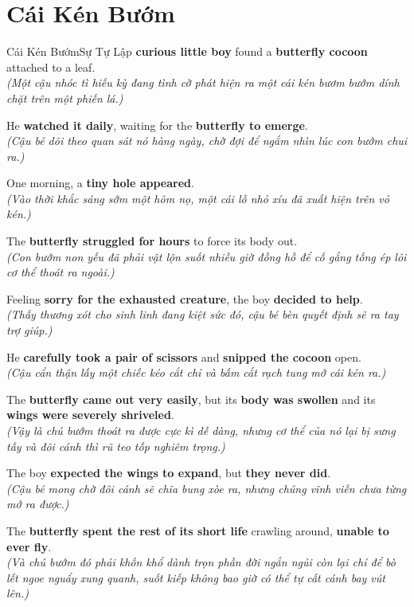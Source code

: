 \section{Cái Kén Bướm}
\begin{truyen}{Cái Kén Bướm}{Sự Tự Lập}
 \textbf{curious little boy} found a \textbf{butterfly cocoon} attached to a leaf.\\
\textit{(Một cậu nhóc tì hiếu kỳ đang tình cờ phát hiện ra một cái kén bươm bướm dính chặt trên một phiến lá.)}

He \textbf{watched it daily}, waiting for the \textbf{butterfly to emerge}.\\
\textit{(Cậu bé dõi theo quan sát nó hàng ngày, chờ đợi để ngắm nhìn lúc con bướm chui ra.)}

One morning, a \textbf{tiny hole appeared}.\\
\textit{(Vào thời khắc sáng sớm một hôm nọ, một cái lỗ nhỏ xíu đã xuất hiện trên vỏ kén.)}

The \textbf{butterfly struggled for hours} to force its body out.\\
\textit{(Con bướm non yếu đã phải vật lộn suốt nhiều giờ đồng hồ để cố gắng tống ép lôi cơ thể thoát ra ngoài.)}

Feeling \textbf{sorry for the exhausted creature}, the boy \textbf{decided to help}.\\
\textit{(Thấy thương xót cho sinh linh đang kiệt sức đó, cậu bé bèn quyết định sẽ ra tay trợ giúp.)}

He \textbf{carefully took a pair of scissors} and \textbf{snipped the cocoon} open.\\
\textit{(Cậu cẩn thận lấy một chiếc kéo cắt chỉ và bấm cắt rạch tung mở cái kén ra.)}

The \textbf{butterfly came out very easily}, but its \textbf{body was swollen} and its \textbf{wings were severely shriveled}.\\
\textit{(Vậy là chú bướm thoát ra được cực kì dễ dàng, nhưng cơ thể của nó lại bị sưng tấy và đôi cánh thì rũ teo tốp nghiêm trọng.)}

The boy \textbf{expected the wings to expand}, but \textbf{they never did}.\\
\textit{(Cậu bé mong chờ đôi cánh sẽ chĩa bung xòe ra, nhưng chúng vĩnh viễn chưa từng mở ra được.)}

The \textbf{butterfly spent the rest of its short life} crawling around, \textbf{unable to ever fly}.\\
\textit{(Và chú bướm đó phải khốn khổ dành trọn phần đời ngắn ngủi còn lại chỉ để bò lết ngoe nguẩy xung quanh, suốt kiếp không bao giờ có thể tự cất cánh bay vút lên.)}
\end{truyen}

